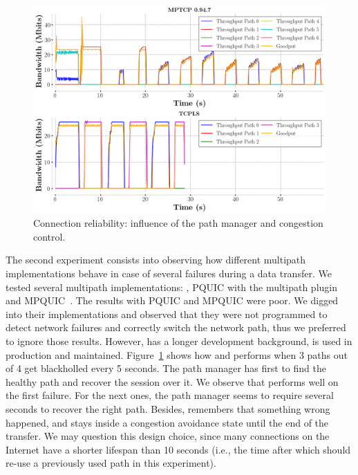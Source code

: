 \begin{figure}[!t] 
  \begin{center}
    \includegraphics[width=\columnwidth]{figures/tcpls_mptcp.png} 
  \end{center}
  \caption{Connection reliability: influence of the path manager and congestion
    control.}
  \label{fig:failover}
\end{figure}

The second experiment consists into observing how different multipath
implementations behave in case of several failures during a data transfer. We
tested several multipath implementations: \mptcp, PQUIC with the multipath
plugin~\cite{pquic} and MPQUIC~\cite{}. The results with PQUIC and MPQUIC were
poor. We digged into their implementations and observed that they were not programmed
to detect network failures and correctly switch the network path, thus we
preferred to ignore those results. However, \mptcp has a longer development
background, is used in production and maintained. Figure~\ref{fig:failover}
shows how \mptcp and \tcpls performs when 3 paths out of 4 get blackholled every
5 seconds. The path manager has first to find the healthy path and recover the
session over it. We observe that \mptcp performs well on the first
failure. For the next ones, the path manager seems to require several seconds to
recover the right path. Besides, \mptcp remembers that something wrong happened,
and stays inside a congestion avoidance state until the end of the transfer. We
may question this design choice, since many \tcp connections on the Internet have
a shorter lifespan than 10 seconds (i.e., the time after which \mptcp should
re-use a previously used path in this experiment).

